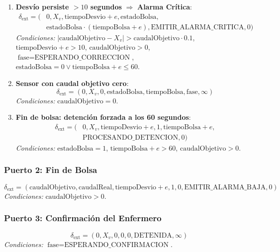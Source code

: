 \documentclass[12pt,a4paper,oneside]{report}
\begin{document}
\begin{enumerate}
    \item \textbf{Desvío persiste $> 10$ segundos} $\Rightarrow$ \textbf{Alarma Crítica}:
    \[
    \begin{aligned}
    \delta_{\text{ext}} = (&0, X_v, \text{tiempoDesvio} + e, \text{estadoBolsa}, \\
    &\text{estadoBolsa} \cdot (\text{tiempoBolsa} + e), \text{EMITIR\_ALARMA\_CRITICA}, 0)
    \end{aligned}
    \]
    \textit{Condiciones:} $|\text{caudalObjetivo} - X_v| > \text{caudalObjetivo} \cdot 0.1$, $\text{tiempoDesvio} + e > 10$, $\text{caudalObjetivo} > 0$, $\text{fase} = \text{ESPERANDO\_CORRECCION}$, $\text{estadoBolsa} = 0 \vee \text{tiempoBolsa} + e \leq 60$.
    
    \item \textbf{Sensor con caudal objetivo cero}:
    \[
    \delta_{\text{ext}} = (0, X_v, 0, \text{estadoBolsa}, \text{tiempoBolsa}, \text{fase}, \infty)
    \]
    \textit{Condiciones:} $\text{caudalObjetivo} = 0$.
    
    \item \textbf{Fin de bolsa: detención forzada a los 60 segundos}:
    \[
    \begin{aligned}
    \delta_{\text{ext}} = (&0, X_v, \text{tiempoDesvio} + e, 1, \text{tiempoBolsa} + e, \\
    &\text{PROCESANDO\_DETENCION}, 0)
    \end{aligned}
    \]
    \textit{Condiciones:} $\text{estadoBolsa} = 1$, $\text{tiempoBolsa} + e > 60$, $\text{caudalObjetivo} > 0$.
\end{enumerate}

\subsubsection{Puerto 2: Fin de Bolsa}

\[
\delta_{\text{ext}} = (\text{caudalObjetivo}, \text{caudalReal}, \text{tiempoDesvio} + e, 1, 0, \text{EMITIR\_ALARMA\_BAJA}, 0)
\]
\textit{Condiciones:} $\text{caudalObjetivo} > 0$.

\subsubsection{Puerto 3: Confirmación del Enfermero}

\[
\delta_{\text{ext}} = (0, X_v, 0, 0, 0, \text{DETENIDA}, \infty)
\]
\textit{Condiciones:} $\text{fase} = \text{ESPERANDO\_CONFIRMACION}$.
\end{document}
